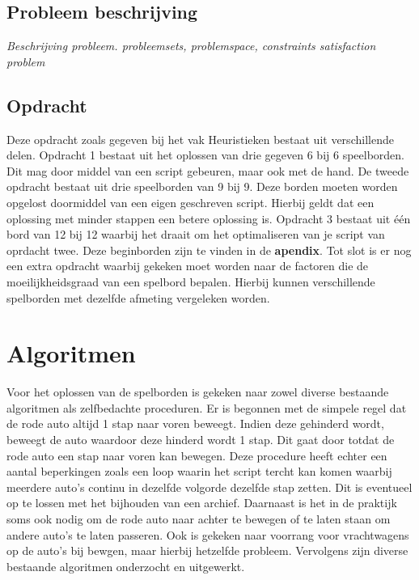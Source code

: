 \documentclass[a4paper]{article}
\begin{document}
\subsection{Probleem beschrijving}
\textit{Beschrijving probleem. probleemsets, problemspace, constraints satisfaction problem}

\subsection{Opdracht}
Deze opdracht zoals gegeven bij het vak Heuristieken bestaat uit verschillende delen. Opdracht 1 bestaat uit het oplossen van drie gegeven 6 bij 6 speelborden. Dit mag door middel van een script gebeuren, maar ook met de hand. De tweede opdracht bestaat uit drie speelborden van 9 bij 9. Deze borden moeten worden opgelost doormiddel van een eigen geschreven script. Hierbij geldt dat een oplossing met minder stappen een betere oplossing is. Opdracht 3 bestaat uit één bord van 12 bij 12 waarbij het draait om het optimaliseren van je script van oprdacht twee. Deze beginborden zijn te vinden in de \textbf{apendix}. Tot slot is er nog een extra opdracht waarbij gekeken moet worden naar de factoren die de moeilijkheidsgraad van een spelbord bepalen. Hierbij kunnen verschillende spelborden met dezelfde afmeting vergeleken worden.

\section{Algoritmen}
Voor het oplossen van de spelborden is gekeken naar zowel diverse bestaande algoritmen als zelfbedachte proceduren. Er is begonnen met de simpele regel dat de rode auto altijd 1 stap naar voren beweegt. Indien deze gehinderd wordt, beweegt de auto waardoor deze hinderd wordt 1 stap. Dit gaat door totdat de rode auto een stap naar voren kan bewegen. Deze procedure heeft echter een aantal beperkingen zoals een loop waarin het script tercht kan komen waarbij meerdere auto's continu in dezelfde volgorde dezelfde stap zetten. Dit is eventueel op te lossen met het bijhouden van een archief. Daarnaast is het in de praktijk soms ook nodig om de rode auto naar achter te bewegen of te laten staan om andere auto's te laten passeren. Ook is gekeken naar voorrang voor vrachtwagens op de auto's bij bewgen, maar hierbij hetzelfde probleem. Vervolgens zijn diverse bestaande algoritmen onderzocht en uitgewerkt.
\end{document}
